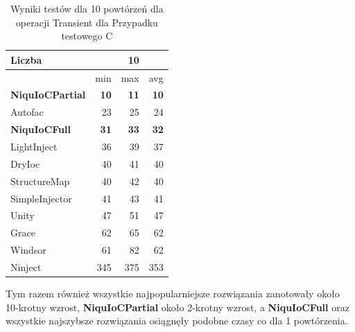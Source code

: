 \documentclass[12pt]{article}
\begin{document}
\begin{table}[H]
\captionsetup{belowskip=0pt,aboveskip=0pt}
\begin{center}
\begin{small}
	\begin{tabular}{ | l | r r r | }
    		\hline
Liczba & & 10 & \\ \hline
 & min & max & avg \\ \hline
\textbf{NiquIoCPartial} & \textbf{10} & \textbf{11} & \textbf{10 }\\ \hline
Autofac & 23 & 25 & 24 \\ \hline
\textbf{NiquIoCFull} & \textbf{31} & \textbf{33} & \textbf{32} \\ \hline
LightInject & 36 & 39 & 37 \\ \hline
DryIoc & 40 & 41 & 40 \\ \hline
StructureMap & 40 & 42 & 40 \\ \hline
SimpleInjector & 41 & 43 & 41 \\ \hline
Unity & 47 & 51 & 47 \\ \hline
Grace & 62 & 65 & 62 \\ \hline
Windsor & 61 & 82 & 62 \\ \hline
Ninject & 345 & 375 & 353 \\ \hline
  	\end{tabular}
\end{small}
\end{center}
\caption{Wyniki testów dla 10 powtórzeń dla operacji Transient dla Przypadku testowego C}
\label{TestCaseC_Transient10}
\end{table}
Tym razem również wszystkie najpopularniejsze rozwiązania zanotowały około 10-krotny wzrost, \textbf{NiquIoCPartial} około 2-krotny wzrost, a \textbf{NiquIoCFull} oraz wszystkie najszybsze rozwiązania osiągnęły podobne czasy co dla 1 powtórzenia.
\\ \\
\end{document}
